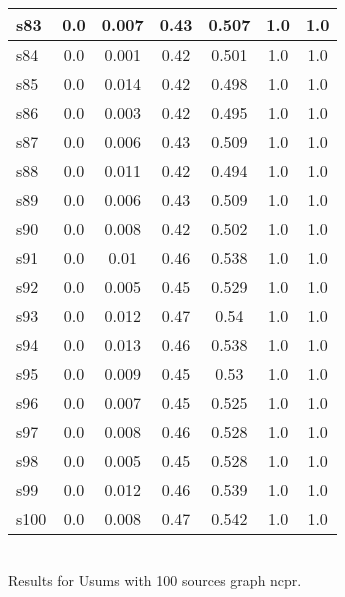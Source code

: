 \documentclass{article}
\begin{document}
\begin{tabular}{|l|c|c|c|c|c|c|}
s83 &0.0 & 0.007 & 0.43 & 0.507 & 1.0 & 1.0\\
\hline
s84 &0.0 & 0.001 & 0.42 & 0.501 & 1.0 & 1.0\\
\hline
s85 &0.0 & 0.014 & 0.42 & 0.498 & 1.0 & 1.0\\
\hline
s86 &0.0 & 0.003 & 0.42 & 0.495 & 1.0 & 1.0\\
\hline
s87 &0.0 & 0.006 & 0.43 & 0.509 & 1.0 & 1.0\\
\hline
s88 &0.0 & 0.011 & 0.42 & 0.494 & 1.0 & 1.0\\
\hline
s89 &0.0 & 0.006 & 0.43 & 0.509 & 1.0 & 1.0\\
\hline
s90 &0.0 & 0.008 & 0.42 & 0.502 & 1.0 & 1.0\\
\hline
s91 &0.0 & 0.01 & 0.46 & 0.538 & 1.0 & 1.0\\
\hline
s92 &0.0 & 0.005 & 0.45 & 0.529 & 1.0 & 1.0\\
\hline
s93 &0.0 & 0.012 & 0.47 & 0.54 & 1.0 & 1.0\\
\hline
s94 &0.0 & 0.013 & 0.46 & 0.538 & 1.0 & 1.0\\
\hline
s95 &0.0 & 0.009 & 0.45 & 0.53 & 1.0 & 1.0\\
\hline
s96 &0.0 & 0.007 & 0.45 & 0.525 & 1.0 & 1.0\\
\hline
s97 &0.0 & 0.008 & 0.46 & 0.528 & 1.0 & 1.0\\
\hline
s98 &0.0 & 0.005 & 0.45 & 0.528 & 1.0 & 1.0\\
\hline
s99 &0.0 & 0.012 & 0.46 & 0.539 & 1.0 & 1.0\\
\hline
s100 &0.0 & 0.008 & 0.47 & 0.542 & 1.0 & 1.0\\
\hline
\end{tabular}\\

\noindent Results for Usums with 100 sources graph ncpr.
\end{document}
